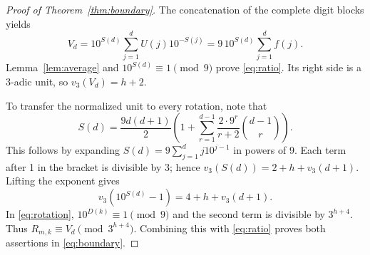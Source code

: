 \documentclass[10pt]{article}
\begin{document}
\begin{proof}[Proof of Theorem~\ref{thm:boundary}]
The concatenation of the complete digit blocks yields
\[
 V_d=10^{S(d)}\sum_{j=1}^d U(j)10^{-S(j)}
     =9\,10^{S(d)}\sum_{j=1}^d f(j).
\]
Lemma~\ref{lem:average} and $10^{S(d)}\equiv1\pmod9$ prove
\eqref{eq:ratio}. Its right side is a 3-adic unit, so $v_3(V_d)=h+2$.

To transfer the normalized unit to every rotation, note that
\begin{equation}\label{eq:S}
 S(d)=\frac{9d(d+1)}2
 \left(1+\sum_{r=1}^{d-1}\frac{2\cdot9^r}{r+2}\binom{d-1}{r}\right).
\end{equation}
This follows by expanding $S(d)=9\sum_{j=1}^d j10^{j-1}$ in powers of 9.
Each term after 1 in the bracket is divisible by 3; hence
$v_3(S(d))=2+h+v_3(d+1)$. Lifting the exponent gives
\[
 v_3(10^{S(d)}-1)=4+h+v_3(d+1).
\]
In \eqref{eq:rotation}, $10^{D(k)}\equiv1\pmod9$ and the second term
is divisible by $3^{h+4}$. Thus $R_{m,k}\equiv V_d\pmod{3^{h+4}}$.
Combining this with \eqref{eq:ratio} proves both assertions in
\eqref{eq:boundary}.
\end{proof}
\end{document}
